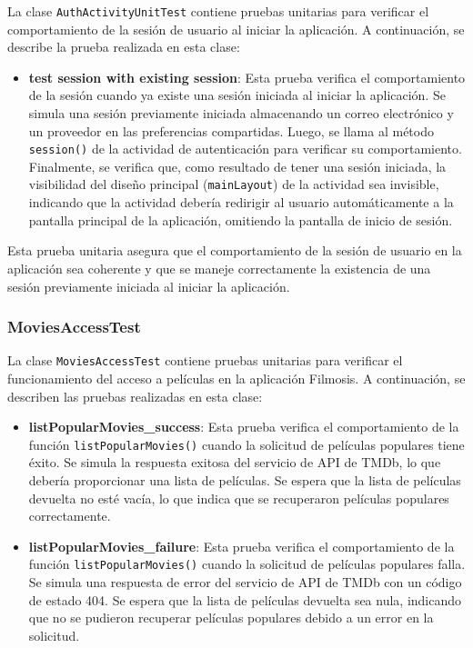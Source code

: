 \documentclass{article}
\begin{document}
La clase \texttt{AuthActivityUnitTest} contiene pruebas unitarias para verificar el comportamiento de la sesión de usuario al iniciar la aplicación. A continuación, se describe la prueba realizada en esta clase:

\begin{itemize}
    \item \textbf{test session with existing session}: Esta prueba verifica el comportamiento de la sesión cuando ya existe una sesión iniciada al iniciar la aplicación. Se simula una sesión previamente iniciada almacenando un correo electrónico y un proveedor en las preferencias compartidas. Luego, se llama al método \texttt{session()} de la actividad de autenticación para verificar su comportamiento. Finalmente, se verifica que, como resultado de tener una sesión iniciada, la visibilidad del diseño principal (\texttt{mainLayout}) de la actividad sea invisible, indicando que la actividad debería redirigir al usuario automáticamente a la pantalla principal de la aplicación, omitiendo la pantalla de inicio de sesión.
\end{itemize}

Esta prueba unitaria asegura que el comportamiento de la sesión de usuario en la aplicación sea coherente y que se maneje correctamente la existencia de una sesión previamente iniciada al iniciar la aplicación.


\subsubsection{MoviesAccessTest}

La clase \texttt{MoviesAccessTest} contiene pruebas unitarias para verificar el funcionamiento del acceso a películas en la aplicación Filmosis. A continuación, se describen las pruebas realizadas en esta clase:

\begin{itemize}
    \item \textbf{listPopularMovies\_success}: Esta prueba verifica el comportamiento de la función \texttt{listPopularMovies()} cuando la solicitud de películas populares tiene éxito. Se simula la respuesta exitosa del servicio de API de TMDb, lo que debería proporcionar una lista de películas. Se espera que la lista de películas devuelta no esté vacía, lo que indica que se recuperaron películas populares correctamente.

    \item \textbf{listPopularMovies\_failure}: Esta prueba verifica el comportamiento de la función \texttt{listPopularMovies()} cuando la solicitud de películas populares falla. Se simula una respuesta de error del servicio de API de TMDb con un código de estado 404. Se espera que la lista de películas devuelta sea nula, indicando que no se pudieron recuperar películas populares debido a un error en la solicitud.
\end{itemize}
\end{document}

